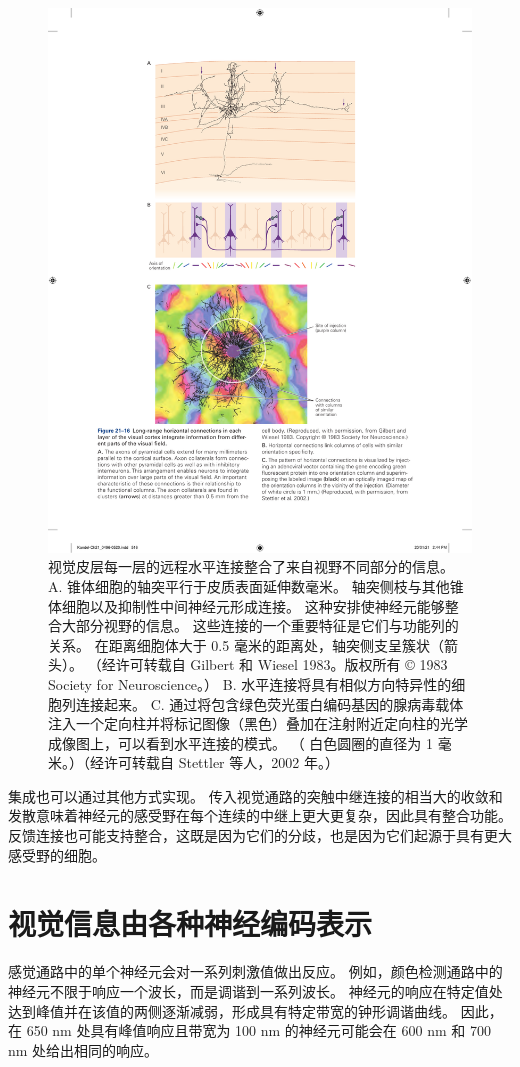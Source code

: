 \begin{figure}[htbp]
	\centering
	\includegraphics[width=0.6\linewidth]{chap21/fig_21_16}
	\caption{视觉皮层每一层的远程水平连接整合了来自视野不同部分的信息。 
		A. 锥体细胞的轴突平行于皮质表面延伸数毫米。 
		轴突侧枝与其他锥体细胞以及抑制性中间神经元形成连接。 
		这种安排使神经元能够整合大部分视野的信息。 
		这些连接的一个重要特征是它们与功能列的关系。 
		在距离细胞体大于 0.5 毫米的距离处，轴突侧支呈簇状（箭头）。 （经许可转载自 Gilbert 和 Wiesel 1983。版权所有 © 1983 Society for Neuroscience。） 
		B. 水平连接将具有相似方向特异性的细胞列连接起来。 
		C. 通过将包含绿色荧光蛋白编码基因的腺病毒载体注入一个定向柱并将标记图像（黑色）叠加在注射附近定向柱的光学成像图上，可以看到水平连接的模式。 （
		白色圆圈的直径为 1 毫米。）（经许可转载自 Stettler 等人，2002 年。）}
	\label{fig:21_16}
\end{figure}


集成也可以通过其他方式实现。 
传入视觉通路的突触中继连接的相当大的收敛和发散意味着神经元的感受野在每个连续的中继上更大更复杂，因此具有整合功能。 
反馈连接也可能支持整合，这既是因为它们的分歧，也是因为它们起源于具有更大感受野的细胞。


\section{视觉信息由各种神经编码表示}
感觉通路中的单个神经元会对一系列刺激值做出反应。 
例如，颜色检测通路中的神经元不限于响应一个波长，而是调谐到一系列波长。 
神经元的响应在特定值处达到峰值并在该值的两侧逐渐减弱，形成具有特定带宽的钟形调谐曲线。 
因此，在 650 nm 处具有峰值响应且带宽为 100 nm 的神经元可能会在 600 nm 和 700 nm 处给出相同的响应。


